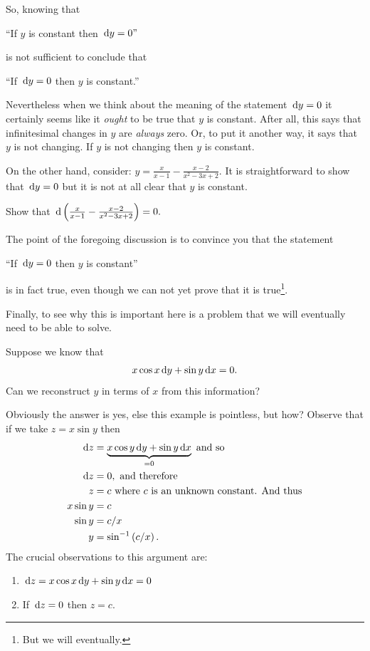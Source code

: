 So, knowing that\\
\centerline{``If $y$ is constant then $\thinspace{\rm d}y=0"$} is not sufficient
to conclude that\\
\centerline{``If $\thinspace{\rm d}y=0$ then $y$ is constant.''}
Nevertheless when we think about the meaning of the statement $\thinspace{\rm d}y=0$
it certainly seems like it \emph{ought} to be true that $y$ is
constant. After all, this says that infinitesimal changes in $y$ are
\emph{always}  zero. Or, to put it another way, it says that $y$ is
not changing. If $y$ is not changing then $y$ is constant.

On the other hand, consider: \(y=\frac{x}{x-1}-\frac{x-2}{x^2-3x+2}.\)
It is straightforward to show that $\thinspace{\rm d}y=0$ but it is not at all clear
that $y$ is constant.

\begin{embeddedproblem}{}
  Show that $\thinspace{\rm d}\left(\frac{x}{x-1}-\frac{x-2}{x^2-3x+2}\right)=0.$
\end{embeddedproblem}

The point of the foregoing discussion is to convince you that the
statement\\
\centerline{``If $\thinspace{\rm d}y=0$ then $y$ is constant''}
is in fact true, even though we can not yet prove that it is true\footnote{But
we will eventually.}.

Finally, to see why this is important here is a problem that we will
eventually need to be able to solve.
\begin{myexample}{}
  \label{ex:exact-differential}
  Suppose we know that
\[ x\cos x\thinspace{\rm d}y +\sin y\thinspace{\rm d}x =0.\]  Can we reconstruct $y$ in terms of $x$ from
this information?

Obviously the answer is yes, else this example is pointless, but how?
Observe that if we take $z=x\sin y$ then 
\begin{align*}
\thinspace{\rm d}z &= \underbrace{x\cos y\thinspace{\rm d}y +\sin y\thinspace{\rm d}x}_{=0} \text{ and so}\\
 \thinspace{\rm d}z &=0, \text{ and therefore}\\
        z&=c \text{ where $c$ is an unknown constant. And thus}\\
  x\sin y&=c\\
  \sin y &=c/x\\
  y&=\sin^{-1}\left(c/x\right).
\end{align*}
The crucial observations to this argument are:
\begin{enumerate}
\item $\thinspace{\rm d}z = x\cos x\thinspace{\rm d}y +\sin y\thinspace{\rm d}x =0$
\item If $\thinspace{\rm d}z = 0$ then $z=c.$
\end{enumerate}
\end{myexample}

